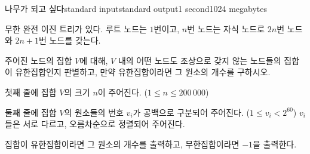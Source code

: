\begin{problem}{나무가 되고 싶다}{standard input}{standard output}{1 second}{1024 megabytes}

무한 완전 이진 트리가 있다. 루트 노드는 $1$번이고, $n$번 노드는 자식 노드로 $2n$번 노드와 $2n + 1$번 노드를 갖는다.

주어진 노드의 집합 $V$에 대해, $V$ 내의 어떤 노드도 조상으로 갖지 않는 노드들의 집합이 유한집합인지 판별하고, 만약 유한집합이라면 그 원소의 개수를 구하시오.

\InputFile
첫째 줄에 집합 $V$의 크기 $n$이 주어진다. ($1 \leq n \leq 200\,000$)

둘째 줄에 집합 $V$의 원소들의 번호 $v_i$가 공백으로 구분되어 주어진다. ($1 \leq v_i < 2^{60}$) $v_i$들은 서로 다르고, 오름차순으로 정렬되어 주어진다.

\OutputFile
집합이 유한집합이라면 그 원소의 개수를 출력하고, 무한집합이라면 $-1$을 출력한다.

\Examples

\begin{example}
%
%
%
\end{example}

\end{problem}

